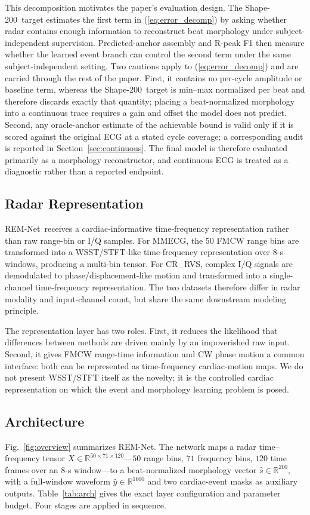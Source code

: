 \documentclass[lettersize,journal]{IEEEtran}
\newcommand{\remnet}{REM-Net\xspace}
\newcommand{\shape}{Shape-200\xspace}
\newcommand{\crrvs}{CR\_RVS\xspace}
\begin{document}
This decomposition motivates the paper's evaluation design. The \shape\ target estimates the first term in (\ref{eq:error_decomp}) by asking whether radar contains enough information to reconstruct beat morphology under subject-independent supervision. Predicted-anchor assembly and R-peak F1 then measure whether the learned event branch can control the second term under the same subject-independent setting. Two cautions apply to (\ref{eq:error_decomp}) and are carried through the rest of the paper. First, it contains no per-cycle amplitude or baseline term, whereas the \shape\ target is min--max normalized per beat and therefore discards exactly that quantity; placing a beat-normalized morphology into a continuous trace requires a gain and offset the model does not predict. Second, any oracle-anchor estimate of the achievable bound is valid only if it is scored against the original ECG at a stated cycle coverage; a corresponding audit is reported in Section~\ref{sec:continuous}. The final model is therefore evaluated primarily as a morphology reconstructor, and continuous ECG is treated as a diagnostic rather than a reported endpoint.

\subsection{Radar Representation}
\remnet\ receives a cardiac-informative time-frequency representation rather than raw range-bin or I/Q samples. For MMECG, the 50 FMCW range bins are transformed into a WSST/STFT-like time-frequency representation over 8-s windows, producing a multi-bin tensor. For \crrvs, complex I/Q signals are demodulated to phase/displacement-like motion and transformed into a single-channel time-frequency representation. The two datasets therefore differ in radar modality and input-channel count, but share the same downstream modeling principle.

The representation layer has two roles. First, it reduces the likelihood that differences between methods are driven mainly by an impoverished raw input. Second, it gives FMCW range-time information and CW phase motion a common interface: both can be represented as time-frequency cardiac-motion maps. We do not present WSST/STFT itself as the novelty; it is the controlled cardiac representation on which the event and morphology learning problem is posed.

\subsection{Architecture}
Fig.~\ref{fig:overview} summarizes \remnet. The network maps a radar time--frequency tensor $X \in \mathbb{R}^{50 \times 71 \times 120}$---$50$ range bins, $71$ frequency bins, $120$ time frames over an $8$-s window---to a beat-normalized morphology vector $\hat{s} \in \mathbb{R}^{200}$, with a full-window waveform $\hat{y} \in \mathbb{R}^{1600}$ and two cardiac-event masks as auxiliary outputs. Table~\ref{tab:arch} gives the exact layer configuration and parameter budget. Four stages are applied in sequence.
\end{document}
